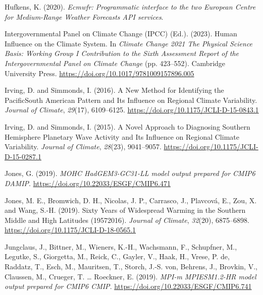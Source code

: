 \documentclass[12pt,oneside,a4paper]{reedthesis}
\newlength{\cslhangindent}
\newenvironment{CSLReferences}[2] %
 {%
  \setlength{\parindent}{0pt}
  \ifodd #1 \everypar{\setlength{\hangindent}{\cslhangindent}}\ignorespaces\fi
  \ifnum #2 > 0
  \setlength{\parskip}{#2\baselineskip}
  \fi
 }%
 {}
\begin{document}
\begin{CSLReferences}{1}{0}
\leavevmode{}%
Hufkens, K. (2020). \emph{Ecmwfr: {Programmatic} interface to the two {European Centre} for {Medium-Range Weather Forecasts API} services}.

\leavevmode{}%
Intergovernmental Panel on Climate Change (IPCC) (Ed.). (2023). Human {Influence} on the {Climate System}. In \emph{Climate {Change} 2021 {\textendash} {The Physical Science Basis}: {Working Group I Contribution} to the {Sixth Assessment Report} of the {Intergovernmental Panel} on {Climate Change}} (pp. 423--552). {Cambridge University Press}. \url{https://doi.org/10.1017/9781009157896.005}

\leavevmode{}%
Irving, D. and Simmonds, I. (2016). A {New Method} for {Identifying} the {Pacific}{\textendash}{South American Pattern} and {Its Influence} on {Regional Climate Variability}. \emph{Journal of Climate}, \emph{29}(17), 6109--6125. \url{https://doi.org/10.1175/JCLI-D-15-0843.1}

\leavevmode{}%
Irving, D. and Simmonds, I. (2015). A {Novel Approach} to {Diagnosing Southern Hemisphere Planetary Wave Activity} and {Its Influence} on {Regional Climate Variability}. \emph{Journal of Climate}, \emph{28}(23), 9041--9057. \url{https://doi.org/10.1175/JCLI-D-15-0287.1}

\leavevmode{}%
Jones, G. (2019). \emph{MOHC HadGEM3-GC31-LL model output prepared for CMIP6 DAMIP}. \url{https://doi.org/10.22033/ESGF/CMIP6.471}

\leavevmode{}%
Jones, M. E., Bromwich, D. H., Nicolas, J. P., Carrasco, J., Plavcová, E., Zou, X. and Wang, S.-H. (2019). Sixty {Years} of {Widespread Warming} in the {Southern Middle} and {High Latitudes} (1957{\textendash}2016). \emph{Journal of Climate}, \emph{32}(20), 6875--6898. \url{https://doi.org/10.1175/JCLI-D-18-0565.1}

\leavevmode{}%
Jungclaus, J., Bittner, M., Wieners, K.-H., Wachsmann, F., Schupfner, M., Legutke, S., Giorgetta, M., Reick, C., Gayler, V., Haak, H., Vrese, P. de, Raddatz, T., Esch, M., Mauritsen, T., Storch, J.-S. von, Behrens, J., Brovkin, V., Claussen, M., Crueger, T. \ldots{} Roeckner, E. (2019). \emph{MPI-m MPIESM1.2-HR model output prepared for CMIP6 CMIP}. \url{https://doi.org/10.22033/ESGF/CMIP6.741}


\end{CSLReferences}
\end{document}
